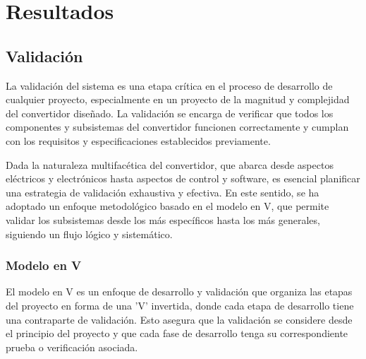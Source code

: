 \chapter{Resultados}

\section{Validación}
La validación del sistema es una etapa crítica en el proceso de desarrollo de cualquier proyecto, especialmente en un proyecto de la magnitud y complejidad del convertidor diseñado. La validación se encarga de verificar que todos los componentes y subsistemas del convertidor funcionen correctamente y cumplan con los requisitos y especificaciones establecidos previamente.

Dada la naturaleza multifacética del convertidor, que abarca desde aspectos eléctricos y electrónicos hasta aspectos de control y software, es esencial planificar una estrategia de validación exhaustiva y efectiva. En este sentido, se ha adoptado un enfoque metodológico basado en el modelo en V, que permite validar los subsistemas desde los más específicos hasta los más generales, siguiendo un flujo lógico y sistemático. 

\subsection{Modelo en V}

El modelo en V es un enfoque de desarrollo y validación que organiza las etapas del proyecto en forma de una 'V' invertida, donde cada etapa de desarrollo tiene una contraparte de validación. Esto asegura que la validación se considere desde el principio del proyecto y que cada fase de desarrollo tenga su correspondiente prueba o verificación asociada.

